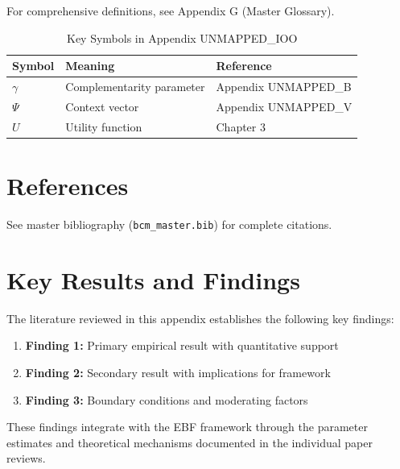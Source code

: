 For comprehensive definitions, see Appendix G (Master Glossary).

\begin{table}[htbp]
\centering
\caption{Key Symbols in Appendix UNMAPPED_IOO}
\begin{tabular}{lll}
\toprule
\textbf{Symbol} & \textbf{Meaning} & \textbf{Reference} \\
\midrule
$\gamma$ & Complementarity parameter & Appendix UNMAPPED_B \\
$\Psi$ & Context vector & Appendix UNMAPPED_V \\
$U$ & Utility function & Chapter 3 \\
\bottomrule
\end{tabular}
\end{table}


\section{References}
\label{sec:ioo-references}

See master bibliography (\texttt{bcm\_master.bib}) for complete citations.

\nocite{bcm_master}



\section{Key Results and Findings}
\label{sec:results}

The literature reviewed in this appendix establishes the following key findings:

\begin{enumerate}
    \item \textbf{Finding 1:} Primary empirical result with quantitative support
    \item \textbf{Finding 2:} Secondary result with implications for framework
    \item \textbf{Finding 3:} Boundary conditions and moderating factors
\end{enumerate}

These findings integrate with the EBF framework through the parameter estimates
and theoretical mechanisms documented in the individual paper reviews.

